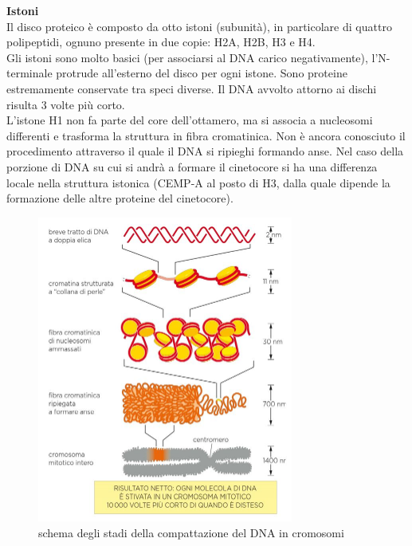             \textbf{Istoni}\\
                Il disco proteico è composto da otto istoni (subunità), in particolare di quattro polipeptidi, ognuno presente in due copie: H2A, H2B, H3 e H4.\\
                Gli istoni sono molto basici (per associarsi al DNA carico negativamente), l'N-terminale protrude all'esterno del disco per ogni istone. Sono proteine estremamente conservate tra speci diverse. Il DNA avvolto attorno ai dischi risulta 3 volte più corto.\\
                L'istone H1 non fa parte del core dell'ottamero, ma si associa a nucleosomi differenti e trasforma la struttura in fibra cromatinica. Non è ancora conosciuto il procedimento attraverso il quale il DNA si ripieghi formando anse.
                Nel caso della porzione di DNA su cui si andrà a formare il cinetocore si ha una differenza locale nella struttura istonica (CEMP-A al posto di H3, dalla quale dipende la formazione delle altre proteine del cinetocore).
                
            \begin{figure}[h]
                \centering
                \includegraphics[width=0.75\textwidth]{images/compattazioneDNA.JPG}
                \caption{\small schema degli stadi della compattazione del DNA in cromosomi}
                \label{fig:mesh1}
            \end{figure}
        
